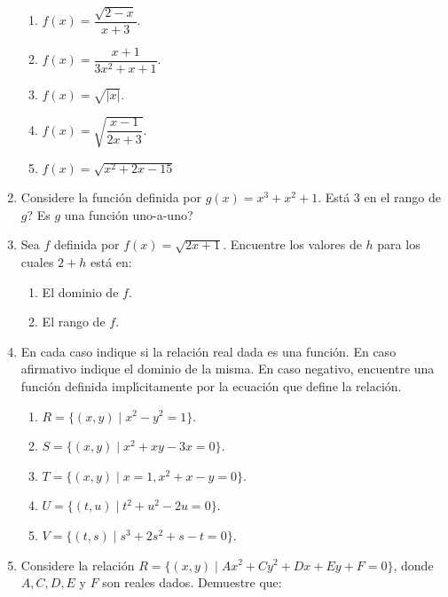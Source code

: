 \begin{enumerate}
\begin{enumerate}
\item $f(x)=\dfrac{\sqrt{2-x}}{x+3}$.

\item $f(x)=\dfrac{x+1}{3x^{2}+x+1}$.

\item $f(x)=\sqrt{|x|}$.

\item $f(x)=\sqrt{\dfrac{x-1}{2x+3}}$.

\item $f\left(  x\right)  =\sqrt{x^{2}+2x-15}$
\end{enumerate}

\item Considere la funci\'{o}n definida por $g(x)=x^{3}+x^{2}+1$.
\textquestiondown Est\'{a} $3$ en el rango de $g$? \textquestiondown Es $g$
una funci\'{o}n uno-a-uno?

\item Sea $f$ definida por $f(x)=\sqrt{2x+1}$. Encuentre los valores de $h$
para los cuales $2+h$ est\'{a} en:

\begin{enumerate}
\item El dominio de $f$.

\item El rango de $f$.
\end{enumerate}

\item En cada caso indique si la relaci\'{o}n real dada es una funci\'{o}n. En
caso afirmativo indique el dominio de la misma. En caso negativo, encuentre
una funci\'{o}n definida impl\'{\i}citamente por la ecuaci\'{o}n que define la relaci\'{o}n.

\begin{enumerate}
\item $R=\{(x,y)\mid x^{2}-y^{2}=1\}$.

\item $S=\{(x,y)\mid x^{2}+xy-3x=0\}$.

\item $T=\{(x,y)\mid x=1,x^{2}+x-y=0\}$.

\item $U=\{(t,u)\mid t^{2}+u^{2}-2u=0\}$.

\item $V=\{(t,s)\mid s^{3}+2s^{2}+s-t=0\}$.
\end{enumerate}

\item Considere la relaci\'{o}n $R=\{(x,y)\mid Ax^{2}+Cy^{2}+Dx+Ey+F=0\}$,
donde $A,C,D,E$ y $F$ son reales dados. Demuestre que:


\end{enumerate}
